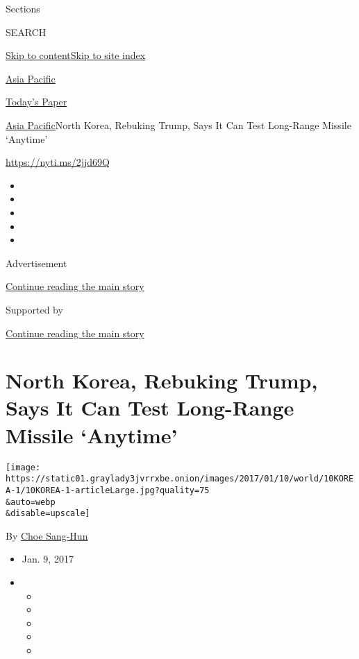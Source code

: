 Sections

SEARCH

\protect\hyperlink{site-content}{Skip to
content}\protect\hyperlink{site-index}{Skip to site index}

\href{https://www.nytimes3xbfgragh.onion/section/world/asia}{Asia
Pacific}

\href{https://myaccount.nytimes3xbfgragh.onion/auth/login?response_type=cookie\&client_id=vi}{}

\href{https://www.nytimes3xbfgragh.onion/section/todayspaper}{Today's
Paper}

\href{/section/world/asia}{Asia Pacific}\textbar{}North Korea, Rebuking
Trump, Says It Can Test Long-Range Missile `Anytime'

\url{https://nyti.ms/2jjd69Q}

\begin{itemize}
\item
\item
\item
\item
\item
\end{itemize}

Advertisement

\protect\hyperlink{after-top}{Continue reading the main story}

Supported by

\protect\hyperlink{after-sponsor}{Continue reading the main story}

\hypertarget{north-korea-rebuking-trump-says-it-can-test-long-range-missile-anytime}{%
\section{North Korea, Rebuking Trump, Says It Can Test Long-Range
Missile
`Anytime'}\label{north-korea-rebuking-trump-says-it-can-test-long-range-missile-anytime}}

\texttt{[image: https://static01.graylady3jvrrxbe.onion/images/2017/01/10/world/10KOREA-1/10KOREA-1-articleLarge.jpg?quality=75\\\&auto=webp\\\&disable=upscale]}

By \href{http://www.nytimes3xbfgragh.onion/by/choe-sang-hun}{Choe
Sang-Hun}

\begin{itemize}
\item
  Jan. 9, 2017
\item
  \begin{itemize}
  \item
  \item
  \item
  \item
  \item
  \end{itemize}
\end{itemize}

